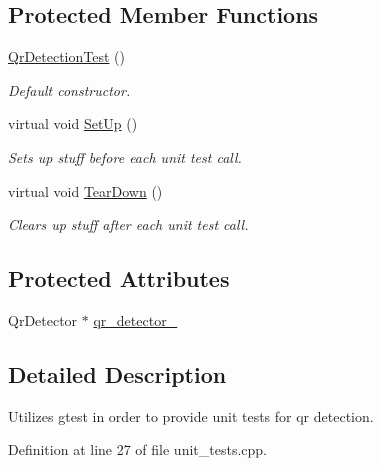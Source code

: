 \subsection*{Protected Member Functions}
\begin{DoxyCompactItemize}
\item 
\hyperlink{classQrDetectionTest_a355fddb07a4da10daacfc44b0f18ed7e}{Qr\-Detection\-Test} ()
\begin{DoxyCompactList}\small\item\em Default constructor. \end{DoxyCompactList}\item 
virtual void \hyperlink{classQrDetectionTest_aaa2db67a98ba4e75ddf81d5d2c2d07ff}{Set\-Up} ()
\begin{DoxyCompactList}\small\item\em Sets up stuff before each unit test call. \end{DoxyCompactList}\item 
virtual void \hyperlink{classQrDetectionTest_a3ca1c254bc4c0466f16a5783711acfda}{Tear\-Down} ()
\begin{DoxyCompactList}\small\item\em Clears up stuff after each unit test call. \end{DoxyCompactList}\end{DoxyCompactItemize}
\subsection*{Protected Attributes}
\begin{DoxyCompactItemize}
\item 
Qr\-Detector $\ast$ \hyperlink{classQrDetectionTest_ac62a7bc15bd994065114bea3f5e7680c}{qr\-\_\-detector\-\_\-}
\end{DoxyCompactItemize}


\subsection{Detailed Description}
Utilizes gtest in order to provide unit tests for qr detection. 

Definition at line 27 of file unit\-\_\-tests.\-cpp.



